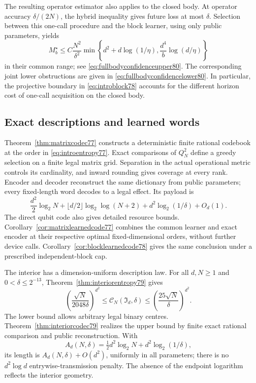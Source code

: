 The resulting operator estimator also applies to the closed body.
At operator accuracy $\delta/(2N)$, the hybrid inequality gives
future loss at most $\delta$.  Selection between this one-call
procedure and the block learner, using only public parameters,
yields
\[
 M_b^\star\le C\frac{N^2}{\delta^2}
 \min\left\{d^2+d\log(1/\eta),\frac{d^4}{b}\log(d/\eta)\right\}
\]
in their common range; see
\eqref{eq:fullbodyconfidenceupper80}.  The corresponding joint
lower obstructions are given in
\eqref{eq:fullbodyconfidencelower80}.  In particular, the projective
boundary in \eqref{eq:introblock78} accounts for the different
horizon cost of one-call acquisition on the closed body.

\subsection{Exact descriptions and learned words}
Theorem~\ref{thm:matrixcodec77} constructs a deterministic finite
rational codebook at the order in \eqref{eq:introentropy77}.
Exact comparisons of $Q_N^2$ define a greedy selection on a finite
legal matrix grid.  Separation in the actual operational metric
controls its cardinality, and inward rounding gives coverage at
every rank.  Encoder and decoder reconstruct the same dictionary
from public parameters; every fixed-length word decodes to a legal
effect.  Its payload is
\[
 \frac{d^2}{2}\log_2N+
 \lfloor d/2\rfloor\log_2\log(N+2)
             +d^2\log_2(1/\delta)+O_d(1).
\]
The direct qubit code also gives detailed resource bounds.
Corollary~\ref{cor:matrixlearnedcode77} combines the common learner
and exact encoder at their respective optimal fixed-dimensional
orders, without further device calls.
Corollary~\ref{cor:blocklearnedcode78} gives the same conclusion
under a prescribed independent-block cap.

The interior has a dimension-uniform description law.  For all
$d,N\ge1$ and $0<\delta\le2^{-13}$,
Theorem~\ref{thm:interiorentropy79} gives
\begin{equation}\label{eq:introinteriorentropy79}
 \left(\frac{\sqrt N}{2048\delta}\right)^{d^2}
 \le\mathcal C_N(\mathfrak I_d,\delta)
 \le\left(\frac{25\sqrt N}{\delta}\right)^{d^2}.
\end{equation}
The lower bound allows arbitrary legal binary centres.
Theorem~\ref{thm:interiorcodec79} realizes the upper bound by
finite exact rational comparison and public reconstruction.  With
\[
 A_d(N,\delta)=\tfrac12d^2\log_2N+d^2\log_2(1/\delta),
\]
its length is $A_d(N,\delta)+O(d^2)$, uniformly in all parameters;
there is no $d^2\log d$ entrywise-transmission penalty.  The
absence of the endpoint logarithm reflects the interior geometry.

